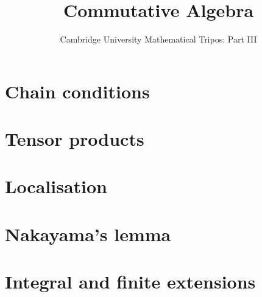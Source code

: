 \documentclass{article}
\title{Commutative Algebra}
\author{Cambridge University Mathematical Tripos: Part III}
\begin{document}
\maketitle

\tableofcontentsnewpage{}

\section{Chain conditions}

\section{Tensor products}

\section{Localisation}

\section{Nakayama's lemma}

\section{Integral and finite extensions}

\end{document}

